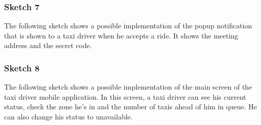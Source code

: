 \subsubsection*{Sketch 7}
The following sketch shows a possible implementation of the popup notification that is shown to a taxi driver when he accepts a ride. It shows the meeting address and the secret code.
\begin{figure}[H]
\centering
{}
\end{figure}


\subsubsection*{Sketch 8}
The following sketch shows a possible implementation of the main screen of the taxi driver mobile application. In this screen, a taxi driver can see his current status, check the zone he's in and the number of taxis ahead of him in queue. He can also change his status to unavailable.
\begin{figure}[H]
\centering
{}
\end{figure}



